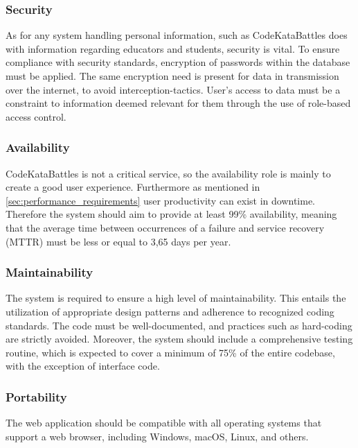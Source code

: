 \subsubsection{Security}
As for any system handling personal information, such as CodeKataBattles does with information regarding educators and students, security is vital. 
To ensure compliance with security standards, encryption of passwords within the database must be applied. The same encryption need is present for data in transmission over the internet, to avoid interception-tactics. User's access to data must be a constraint to information deemed relevant for them through the use of role-based access control. 

\subsubsection{Availability}
CodeKataBattles is not a critical service, so the availability role is mainly to create a good user experience. Furthermore as mentioned in \ref{sec:performance_requirements} user productivity can exist in downtime. Therefore the system should aim to provide at least 99\% availability, meaning that the average time between occurrences of a failure and
service recovery (MTTR) must be less or equal to 3,65 days per year. 

\subsubsection{Maintainability}
The system is required to ensure a high level of maintainability. This entails the utilization of appropriate design patterns and adherence to recognized coding standards. The code must be well-documented, and practices such as hard-coding are strictly avoided. Moreover, the system should include a comprehensive testing routine, which is expected to cover a minimum of 75\% of the entire codebase, with the exception of interface code.

\subsubsection{Portability}
The web application should be compatible with all operating systems that support a web browser, including Windows, macOS, Linux, and others.

